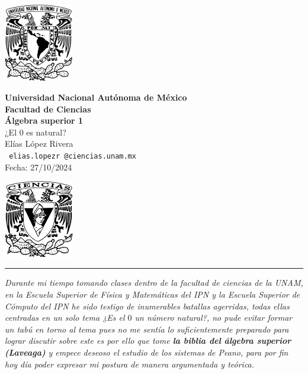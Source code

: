 \documentclass[11pt,letterpaper]{article}
\begin{document}

\begin{center}
    \begin{minipage}{3cm}
    	\begin{center}
    		\includegraphics[height=3.4cm]{logo_unam.png}
    	\end{center}
    \end{minipage}\hfill
    \begin{minipage}{10cm}
    	\begin{center}
    	\textbf{\large Universidad Nacional Autónoma de México}\\[0.1cm]
        \textbf{Facultad de Ciencias}\\[0.1cm]
        \textbf{\'Algebra superior 1}\\[0.1cm]
        ¿El $0$ es natural?\\[0.1cm]
         El\'ias L\'opez Rivera\\[0.1cm]
        \texttt{ elias.lopezr\,@ciencias.unam.mx }\\[0.1cm]
        Fecha:\,\,27/10/2024
    	\end{center}
    \end{minipage}\hfill
    \begin{minipage}{3cm}
    	\begin{center}
    		\includegraphics[height=3.4cm]{Logo_FC.png}
    	\end{center}
    \end{minipage}
\end{center}

\rule{17cm}{0.1mm}

\begin{tcolorbox}[
	title = \textcolor{black}{\textcolor{white}{Preambulo}},]
\textit{Durante mi tiempo tomando clases dentro de la facultad de ciencias de la UNAM, en la Escuela Superior de F\'isica y Matem\'aticas del IPN y
la Escuela Superior de C\'omputo del IPN he sido testigo de inumerables batallas agerridas, todas ellas centradas en un solo tema 
¿Es el $0$ un n\'umero natural?, no pude evitar formar un tab\'u en torno al tema pues no me sent\'ia lo suficientemente preparado para lograr discutir sobre este
es por ello que tome \textbf{la biblia del \'algebra superior (Laveaga)} y empece deseoso el estudio de los sistemas de Peano, para por fin hoy d\'ia
poder expresar mi postura de manera argumentada y te\'orica.
}
\end{tcolorbox}\,\\
\end{document}
